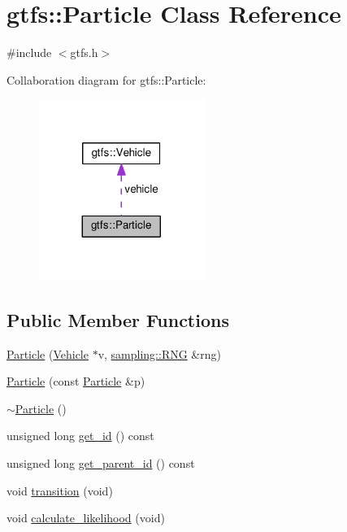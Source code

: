 \hypertarget{classgtfs_1_1Particle}{}\section{gtfs\+:\+:Particle Class Reference}
\label{classgtfs_1_1Particle}


{\ttfamily \#include $<$gtfs.\+h$>$}



Collaboration diagram for gtfs\+:\+:Particle\+:\nopagebreak
\begin{figure}[H]
\begin{center}
\leavevmode
\includegraphics[width=152pt]{classgtfs_1_1Particle__coll__graph}
\end{center}
\end{figure}
\subsection*{Public Member Functions}
\begin{DoxyCompactItemize}
\item 
\hyperlink{classgtfs_1_1Particle_ae59d459c6ff20eb081a933b304289794}{Particle} (\hyperlink{classgtfs_1_1Vehicle}{Vehicle} $\ast$v, \hyperlink{classsampling_1_1RNG}{sampling\+::\+R\+NG} \&rng)
\item 
\hyperlink{classgtfs_1_1Particle_ac386e64b43b1e317063f9a6666d604ce}{Particle} (const \hyperlink{classgtfs_1_1Particle}{Particle} \&p)
\item 
\hyperlink{classgtfs_1_1Particle_a3accf3496ad8460b4ad8b3f6da2de411}{$\sim$\+Particle} ()
\item 
unsigned long \hyperlink{classgtfs_1_1Particle_a3131eb93ac902a4cccf42061e1a7296b}{get\+\_\+id} () const
\item 
unsigned long \hyperlink{classgtfs_1_1Particle_a9372dbbfe702b9931b9eb1ee217afcba}{get\+\_\+parent\+\_\+id} () const
\item 
void \hyperlink{classgtfs_1_1Particle_a768469c09fdebd8e190c91a653b25b76}{transition} (void)
\item 
void \hyperlink{classgtfs_1_1Particle_a88627efbe0eb2e289315ae82627d3a39}{calculate\+\_\+likelihood} (void)
\end{DoxyCompactItemize}
